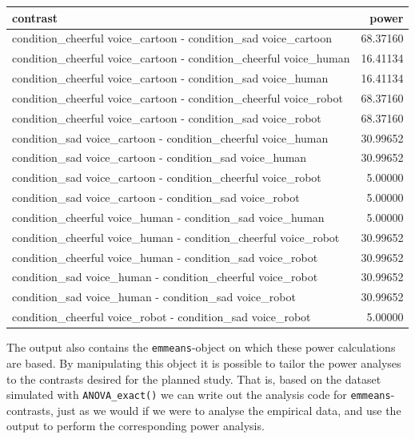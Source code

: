 \documentclass[
]{book}
\begin{document}
\begin{tabular}{l|r}
\hline
contrast & power\\
\hline
condition\_cheerful voice\_cartoon - condition\_sad voice\_cartoon & 68.37160\\
\hline
condition\_cheerful voice\_cartoon - condition\_cheerful voice\_human & 16.41134\\
\hline
condition\_cheerful voice\_cartoon - condition\_sad voice\_human & 16.41134\\
\hline
condition\_cheerful voice\_cartoon - condition\_cheerful voice\_robot & 68.37160\\
\hline
condition\_cheerful voice\_cartoon - condition\_sad voice\_robot & 68.37160\\
\hline
condition\_sad voice\_cartoon - condition\_cheerful voice\_human & 30.99652\\
\hline
condition\_sad voice\_cartoon - condition\_sad voice\_human & 30.99652\\
\hline
condition\_sad voice\_cartoon - condition\_cheerful voice\_robot & 5.00000\\
\hline
condition\_sad voice\_cartoon - condition\_sad voice\_robot & 5.00000\\
\hline
condition\_cheerful voice\_human - condition\_sad voice\_human & 5.00000\\
\hline
condition\_cheerful voice\_human - condition\_cheerful voice\_robot & 30.99652\\
\hline
condition\_cheerful voice\_human - condition\_sad voice\_robot & 30.99652\\
\hline
condition\_sad voice\_human - condition\_cheerful voice\_robot & 30.99652\\
\hline
condition\_sad voice\_human - condition\_sad voice\_robot & 30.99652\\
\hline
condition\_cheerful voice\_robot - condition\_sad voice\_robot & 5.00000\\
\hline
\end{tabular}

The output also contains the \texttt{emmeans}-object on which these power calculations are based.
By manipulating this object it is possible to tailor the power analyses to the contrasts desired for the planned study.
That is, based on the dataset simulated with \texttt{ANOVA\_exact()} we can write out the analysis code for \texttt{emmeans}-contrasts, just as we would if we were to analyse the empirical data, and use the output to perform the corresponding power analysis.
\end{document}

